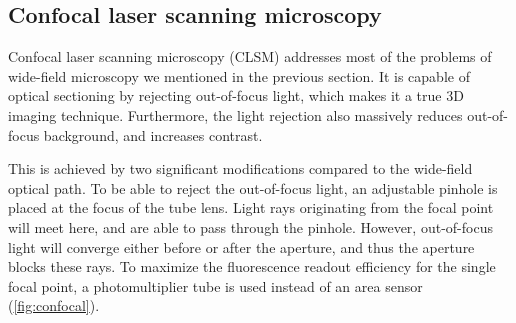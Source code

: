 




                                                              

  \subsection{Confocal laser scanning microscopy}

    Confocal laser scanning microscopy (CLSM) \cite{minsky_microscopy_1961,davidovits_scanning_1969} addresses most of the problems of wide-field microscopy we mentioned in the previous section. It is capable of optical sectioning by rejecting out-of-focus light, which makes it a
    true %
    3D imaging technique. Furthermore, the light rejection also massively reduces out-of-focus background, and increases contrast.

    This is achieved by two significant modifications compared to the wide-field optical path. To be able to reject the out-of-focus light, an adjustable pinhole is placed at the focus of the tube lens. Light rays originating from the focal point will meet here, and are able to pass through the pinhole. However, out-of-focus light will converge either before or after the aperture, and thus the aperture blocks these rays. To maximize the fluorescence readout efficiency for the single focal point, a photomultiplier tube is used instead of an area sensor (\autoref{fig:confocal}).

